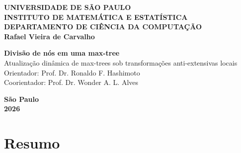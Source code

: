 \documentclass[11pt,a4paper]{article}
\theoremstyle{definition}
\begin{document}
\begin{titlepage}
  \begin{center}
    \singlespacing %

    \textbf{UNIVERSIDADE DE SÃO PAULO}\\
    \textbf{INSTITUTO DE MATEMÁTICA E ESTATÍSTICA}\\
    \textbf{DEPARTAMENTO DE CIÊNCIA DA COMPUTAÇÃO}\\[4cm]

    {\large \textbf{Rafael Vieira de Carvalho}\\[5cm]}

    {\LARGE \textbf{Divisão de nós em uma max-tree}}\\[0.5cm]
    {\large Atualização dinâmica de max-trees sob transformações
    anti-extensivas locais}\\[4cm]

    {Orientador: Prof. Dr. Ronaldo F. Hashimoto \\
    Coorientador: Prof. Dr. Wonder A. L. Alves}
    
    \vfill %

    \textbf{São Paulo}\\
    \textbf{2026}

  \end{center}
\end{titlepage}

\doublespacing

\newpage
{}

\section{Resumo}


\end{document}
